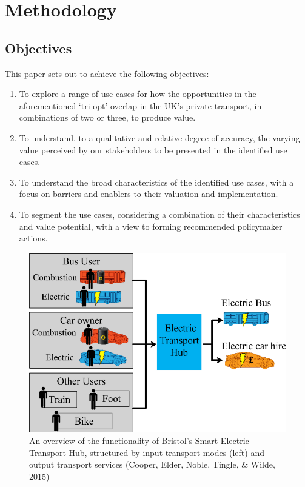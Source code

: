 \documentclass[journal]{IEEEtran}
\begin{document}
\section{Methodology}\label{methodology}

\subsection{Objectives}

This paper sets out to achieve the following objectives:

\begin{enumerate}
\item To explore a range of use cases for how the opportunities in the
  aforementioned `tri-opt' overlap in the UK's private transport, in
  combinations of two or three, to produce value.  
\item To understand, to a qualitative and relative degree of accuracy,
  the varying value perceived by our stakeholders to be presented in
  the identified use cases. 
\item To understand the broad characteristics of the identified use
  cases, with a focus on barriers and enablers to their valuation and
  implementation.
\item To segment the use cases, considering a combination of their
  characteristics and value potential, with a view to forming
  recommended policymaker actions.
\end{enumerate}

\begin{figure}[!htb]
\centering
\includegraphics[width=\columnwidth]{images/bristolhub.png}
\caption{An overview of the functionality of Bristol's Smart Electric
  Transport Hub, structured by input transport modes (left) and output
  transport services (Cooper, Elder, Noble, Tingle, \& Wilde,
  2015)}
\label{fig:bristolhub}
\end{figure}
\end{document}
